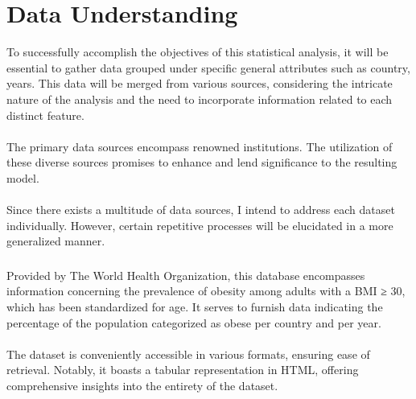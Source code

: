 \part{Data Understanding}
    To successfully accomplish the objectives of this statistical analysis, it will be essential to gather data
    grouped under specific general attributes such as country, years. This data will be merged from various sources,
    considering the intricate nature of the analysis and the need to incorporate information related to each distinct
    feature.
    \\
    \\
    The primary data sources encompass renowned institutions. The utilization of these diverse sources promises to
    enhance and lend significance to the resulting model.
    \\
    \\
    Since there exists a multitude of data sources, I intend to address each dataset individually. However, certain
    repetitive processes will be elucidated in a more generalized manner.


    \section{\dsObesity}

        \subsection{\duCollectInitialData}

            Provided by The World Health Organization, this database encompasses information concerning the prevalence of obesity among adults with a BMI ≥ 30, which has been standardized for age. It serves to furnish data indicating the percentage of the population categorized as obese per country and per year.
            \\
            \\
            The dataset is conveniently accessible in various formats, ensuring ease of retrieval. Notably, it boasts a tabular representation in HTML, offering comprehensive insights into the entirety of the dataset.

